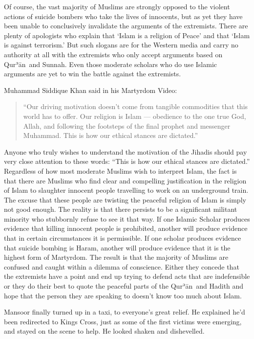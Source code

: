 \documentclass[12pt]{memoir}
\def\´{ʾ} %
\newcommand{\cor}[2]{#2} %
\def \Quran{Qur\-\´ān} %
\begin{document}
Of course, the vast majority of Muslims are strongly opposed \cor{}{to}
the violent actions of suicide bombers
who take the lives of innocents,
but as yet they have been unable to conclusively invalidate
the arguments of the extremists.
There are plenty of apologists who explain that ‘Islam is a religion of Peace’
and that ‘Islam is against terrorism.’
But such slogans are for the Western media and carry no authority at all
with the extremists who only accept arguments based on \Quran\ and Sunnah.
Even those \cor{Moderate}{moderate} scholars who do use Islamic arguments
are yet to win the battle against the extremists.

Muhammad Siddique Khan said in his \cor{Martydom}{Martyrdom} Video:

\begin{quote}
“Our driving motivation doesn’t come from tangible commodities
that this world has to offer.
Our religion is Islam — obedience to the one true God, Allah,
and following the footsteps of the final prophet and messenger Muhammad.
This is how our ethical stances are dictated.”
\end{quote}

Anyone who truly wishes to understand the motivation of the Jihadis
should pay very close attention to these words:
“This is how our ethical stances are dictated.”
Regardless of how most moderate Muslims wish to interpret Islam,
the fact is that there are Muslims who find clear and compelling justification
in the religion of Islam to slaughter innocent people
travelling to work on an underground train.
The excuse that these people are twisting the peaceful religion of Islam
is simply not good enough.
The reality is that there persists to be a significant militant minority
who stubbornly refuse to see it that way.
If one Islamic Scholar produces evidence
that killing innocent people is prohibited,
another will produce evidence that in certain circumstances it is permissible.
If one scholar produces evidence that suicide bombing is Haram,
another will produce evidence that it is the highest form of Martyrdom.
The result is that the majority of Muslims are confused
and caught within a dilemma of conscience.
Either they concede that the extremists have a point
and end up trying to defend acts that are indefensible
or they do their best to quote the peaceful parts of the \Quran\ and Hadith
and hope that the person they are speaking to
doesn’t know too much about Islam.

Mansoor finally turned up in a taxi, to everyone’s great relief.
He explained he’d been re\cor{-}{}directed to Kings Cross,
just as some of the first victims were emerging,
and stayed on the scene to help.
He looked shaken and dishevelled.
\end{document}
